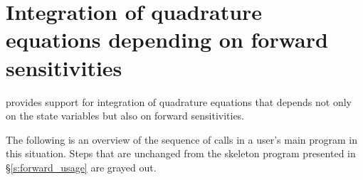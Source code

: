 

\section{Integration of quadrature equations depending on forward sensitivities}

{\idas} provides support for integration of quadrature equations that depends not only 
on the state variables but also on forward sensitivities.


The following is an overview of the sequence of calls in a user's main program in 
this situation. Steps that are unchanged from the skeleton program presented in 
\S\ref{s:forward_usage} are grayed out.

